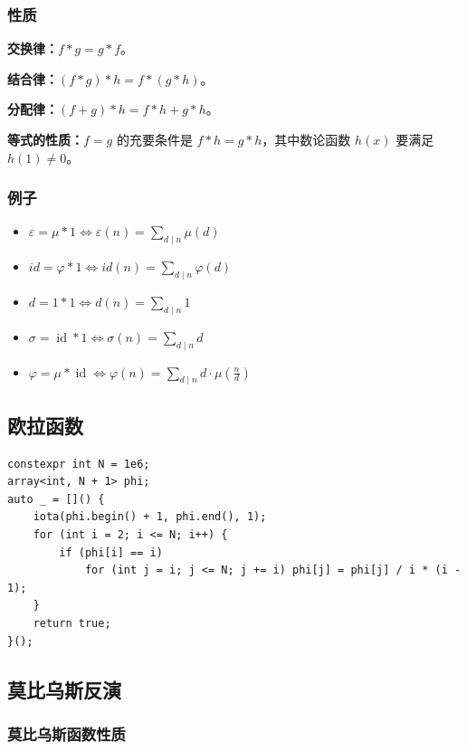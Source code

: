 \documentclass[UTF8]{ctexart}
\begin{document}
\begin{sloppypar}
\subsubsection{性质}

\textbf{交换律：}$f*g=g*f$。

\textbf{结合律：}$(f*g)*h=f*(g*h)$。

\textbf{分配律：}$(f+g)*h=f*h+g*h$。

\textbf{等式的性质：}$f=g$ 的充要条件是 $f*h=g*h$，其中数论函数 $h(x)$ 要满足 $h(1)\ne 0$。

\subsubsection{例子}

\begin{itemize}
   \item $\varepsilon=\mu \ast 1\iff\varepsilon(n)=\sum_{d\mid n}\mu(d)$
   \item $id = \varphi * 1 \iff id(n)=\sum_{d\mid n} \varphi(d)$
   \item $d=1 \ast 1\iff d(n)=\sum_{d\mid n}1$
   \item $\sigma=\operatorname{id} \ast 1\iff\sigma(n)=\sum_{d\mid n}d$
   \item $\varphi=\mu \ast \operatorname{id}\iff\varphi(n)=\sum_{d\mid n}d\cdot\mu(\frac{n}{d})$
\end{itemize}

\subsection{欧拉函数}

\begin{lstlisting}[style=cpp]
constexpr int N = 1e6;
array<int, N + 1> phi;
auto _ = []() {
    iota(phi.begin() + 1, phi.end(), 1);
    for (int i = 2; i <= N; i++) {
        if (phi[i] == i)
            for (int j = i; j <= N; j += i) phi[j] = phi[j] / i * (i - 1);
    }
    return true;
}();
\end{lstlisting}

\subsection{莫比乌斯反演}

\subsubsection{莫比乌斯函数性质}


\end{sloppypar}
\end{document}

